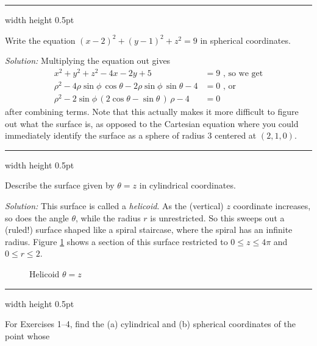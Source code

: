 \vspace{2mm}
\hrule width \textwidth height 0.5pt
\begin{exmp}
 Write the equation $(x - 2)^2 + (y - 1)^2 + z^2 = 9$ in spherical coordinates.\vspace{1mm}
 \par\noindent \emph{Solution:} Multiplying the equation out gives
 \begin{align*}
  x^2 + y^2 + z^2 - 4x - 2y + 5 &= 9 \text{~, so we get}\\
  \rho^2 - 4 \rho \sin \phi \,\cos \theta - 2 \rho \sin \phi \,\sin \theta - 4 &= 0 \text{~,~or}\\
  \rho^2 - 2 \sin \phi \, ( 2 \cos \theta - \sin \theta \, ) \,\rho - 4 &= 0
 \end{align*}
 after combining terms. Note that this actually makes it more difficult to figure out what the surface is,
 as opposed to the Cartesian equation where you could immediately identify the surface as a sphere of radius $3$ centered
 at $(2,1,0)$.
\end{exmp}
\hrule width \textwidth height 0.5pt
\begin{exmp}\label{exmp:helicoid}
 Describe the surface given by $\theta = z$ in cylindrical coordinates.\vspace{1mm}
 \par\noindent \emph{Solution:} This surface is called a \emph{helicoid}. As the (vertical) $z$
 coordinate increases, so does the angle $\theta$, while the radius $r$ is unrestricted. So this sweeps out a (ruled!)
 surface shaped like a spiral staircase, where the spiral has an infinite radius. Figure \ref{fig:helicoid} shows a
 section of this surface restricted to $0 \le z \le 4\pi$ and $0 \le r \le 2$.\vspace{-20mm}
 \begin{figure}[h]
  \begin{center}
   
  \end{center}\vspace{-12mm}
 \caption[]{\quad Helicoid $\theta = z$}
 \label{fig:helicoid}
 \end{figure}
\end{exmp}\vspace{-4mm}
\hrule width \textwidth height 0.5pt
\newpage
\centerline{}\label{sec1dot7}
\par\noindent For Exercises 1--4, find the (a) cylindrical and (b) spherical coordinates of the point whose
